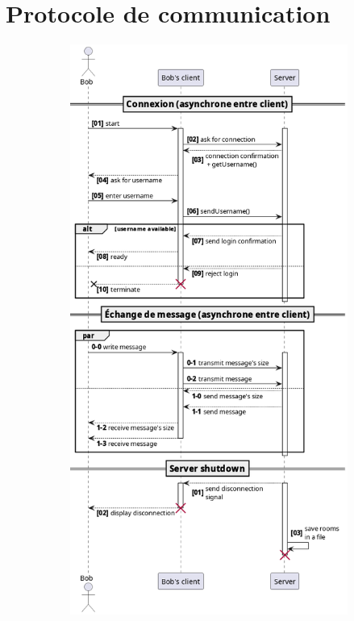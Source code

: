 \documentclass[a4paper,12pt]{article}
\begin{document}
\section{Protocole de communication}
\begin{figure}[h]
	\centering
	\begin{subfigure}{0.45\linewidth}
		\includegraphics[width=\linewidth]{sequence.png}

\end{subfigure}
\end{figure}
\end{document}
